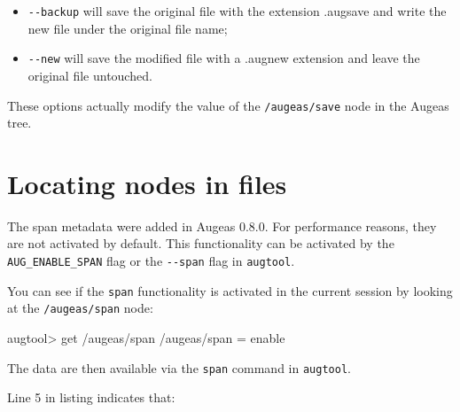 \begin{itemize}
\item
  \verb!--backup! will save the original file with the extension .augsave and write the new file under the original file name;
\item
  \verb!--new! will save the modified file with a .augnew extension and leave the original file untouched.
\end{itemize}
These options actually modify the value of the \nolinkurl{/augeas/save} node in the Augeas tree.

\section{Locating nodes in files}

\label{sec:locating_nodes}  

The span metadata were added in Augeas 0.8.0. For performance reasons, they are not activated by default. This functionality can be activated by the \verb!AUG_ENABLE_SPAN! flag or the \verb!--span! flag in \verb!augtool!.

You can see if the \verb!span! functionality is activated in the current session by looking at the \nolinkurl{/augeas/span} node:


\begin{augtoolsh}[]
augtool> get /augeas/span
/augeas/span = enable
\end{augtoolsh}

The data are then available via the \verb!span! command in \verb!augtool!.



Line 5 in listing  indicates that:

